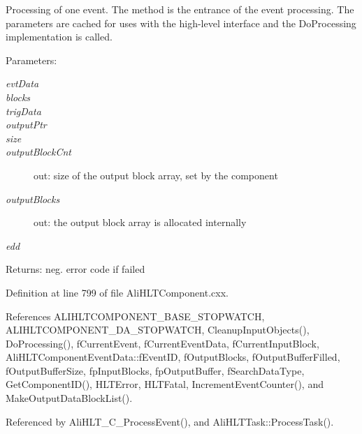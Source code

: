 Processing of one event. The method is the entrance of the event processing. The parameters are cached for uses with the high-level interface and the Do\-Processing implementation is called.

\begin{Desc}
\item[Parameters:]
\begin{description}
\item[{\em evt\-Data}]\item[{\em blocks}]\item[{\em trig\-Data}]\item[{\em output\-Ptr}]\item[{\em size}]\item[{\em output\-Block\-Cnt}]out: size of the output block array, set by the component \item[{\em output\-Blocks}]out: the output block array is allocated internally \item[{\em edd}]\end{description}
\end{Desc}
\begin{Desc}
\item[Returns:]neg. error code if failed \end{Desc}


Definition at line 799 of file Ali\-HLTComponent.cxx.

References ALIHLTCOMPONENT\_\-BASE\_\-STOPWATCH, ALIHLTCOMPONENT\_\-DA\_\-STOPWATCH, Cleanup\-Input\-Objects(), Do\-Processing(), f\-Current\-Event, f\-Current\-Event\-Data, f\-Current\-Input\-Block, Ali\-HLTComponent\-Event\-Data::f\-Event\-ID, f\-Output\-Blocks, f\-Output\-Buffer\-Filled, f\-Output\-Buffer\-Size, fp\-Input\-Blocks, fp\-Output\-Buffer, f\-Search\-Data\-Type, Get\-Component\-ID(), HLTError, HLTFatal, Increment\-Event\-Counter(), and Make\-Output\-Data\-Block\-List().

Referenced by Ali\-HLT\_\-C\_\-Process\-Event(), and Ali\-HLTTask::Process\-Task().

